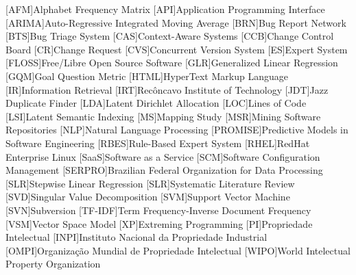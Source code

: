 \begin{acronym}[ACRONYM] 
[AFM]{Alphabet Frequency Matrix}
[API]{Application Programming Interface}
[ARIMA]{Auto-Regressive Integrated Moving Average}
[BRN]{Bug Report Network}
[BTS]{Bug Triage System}
[CAS]{Context-Aware Systems}
[CCB]{Change Control Board}
[CR]{Change Request}
[CVS]{Concurrent Version System}
[ES]{Expert System}
[FLOSS]{Free/Libre Open Source Software}
[GLR]{Generalized Linear Regression}
[GQM]{Goal Question Metric}
[HTML]{HyperText Markup Language}
[IR]{Information Retrieval}
[IRT]{Recôncavo Institute of Technology}
[JDT]{Jazz Duplicate Finder}
[LDA]{Latent Dirichlet Allocation}
[LOC]{Lines of Code}
[LSI]{Latent Semantic Indexing}
[MS]{Mapping Study}
[MSR]{Mining Software Repositories}
[NLP]{Natural Language Processing}
[PROMISE]{Predictive Models in Software Engineering}
[RBES]{Rule-Based Expert System}
[RHEL]{RedHat Enterprise Linux}
[SaaS]{Software as a Service}
[SCM]{Software Configuration Management}
[SERPRO]{Brazilian Federal Organization for Data Processing}
[SLR]{Stepwise Linear Regression}
[SLR]{Systematic Literature Review}
[SVD]{Singular Value Decomposition}
[SVM]{Support Vector Machine}
[SVN]{Subversion}
[TF-IDF]{Term Frequency-Inverse Document Frequency}
[VSM]{Vector Space Model}
[XP]{Extreming Programming}
[PI]{Propriedade Intelectual}
[INPI]{Instituto Nacional da Propriedade Industrial}
[OMPI]{Organização Mundial de Propriedade Intelectual}
[WIPO]{World Intelectual Property Organization}
\end{acronym}